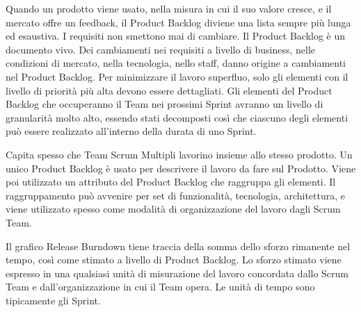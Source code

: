 Quando un prodotto viene usato, nella misura in cui il suo valore cresce, e il mercato offre un feedback, il Product Backlog diviene una lista sempre pi\`u lunga ed esaustiva.
I requisiti non smettono mai di cambiare. Il Product Backlog \`e un documento vivo. Dei cambiamenti nei requisiti a livello di business, nelle condizioni di mercato, nella tecnologia, nello staff, danno origine a cambiamenti nel Product Backlog. 
Per minimizzare il lavoro superfluo, solo gli elementi con il livello di priorit\`a pi\`u alta devono essere dettagliati. Gli elementi del Product Backlog che occuperanno il Team nei prossimi Sprint avranno un livello di granularit\`a molto alto,
essendo stati decomposti cos\`i che ciascuno degli elementi pu\`o essere realizzato all'interno della durata di uno Sprint.
\newline


Capita spesso che Team Scrum Multipli lavorino insieme allo stesso prodotto. Un unico Product Backlog \`e usato per descrivere il lavoro da fare sul Prodotto. Viene poi utilizzato un attributo del Product Backlog che raggruppa gli elementi. Il raggruppamento pu\`o avvenire per set di funzionalit\`a, tecnologia, architettura, e viene utilizzato spesso come modalit\`a  di organizzazione del lavoro dagli Scrum Team.
\newline


Il grafico Release Burndown tiene traccia della somma dello sforzo rimanente nel tempo, cos\`i come stimato a livello di Product Backlog. Lo sforzo stimato viene espresso in una qualsiasi unit\`a  di misurazione del lavoro concordata dallo Scrum Team e dall'organizzazione in cui il Team opera. Le unit\`a di tempo sono tipicamente gli Sprint.
\newline

